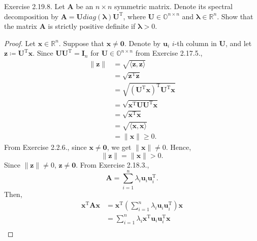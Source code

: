 \documentclass{article}
\theoremstyle{plain}
\begin{document}
\begin{itembox}[l]{Exercise 2.19.8.}
	Let $\bm{A}$ be an $n \times n$ symmetric matrix. Denote its spectral decomposition
	by $\bm{A} =  \bm{U} diag(\bm{\lambda}) \bm{U}^{\mathrm{T}}$,
	where $\bm{U} \in \mathbb{O}^{n \times n}$ and $\bm{\lambda} \in \mathbb{R}^n$.
	Show that the matrix $\bm{A}$ is strictly positive definite if $\bm{\lambda} > 0$.
\end{itembox}


\begin{proof}
	Let $\bm{x} \in \mathbb{R}^n$. Suppose that $\bm{x} \neq \bm{0}$.
	Denote by $\bm{u}_i$ $i$-th column in $\bm{U}$, and let $\bm{z} \coloneq \bm{U}^{\mathrm{T}} \bm{x}$.
	Since $\bm{U} \bm{U}^{\mathrm{T}} = \bm{I}_n$ for $\bm{U} \in \mathbb{O}^{n \times n}$ from Exercise 2.17.5.,
	\begin{equation*}
		\begin{split}
			\lVert \bm{z} \rVert &= \sqrt{\langle \bm{z} , \bm{z} \rangle} \\
			&= \sqrt{\bm{z}^{\mathrm{T}} \bm{z}} \\
			&= \sqrt{(\bm{U}^{\mathrm{T}} \bm{x})^{\mathrm{T}} \bm{U}^{\mathrm{T}} \bm{x}} \\
			&= \sqrt{\bm{x}^{\mathrm{T}} \bm{U} \bm{U}^{\mathrm{T}} \bm{x}} \\
			&= \sqrt{\bm{x}^{\mathrm{T}} \bm{x}} \\
			&= \sqrt{\langle \bm{x} , \bm{x} \rangle} \\
			&= \lVert \bm{x} \rVert \geq 0 .
		\end{split}
	\end{equation*}
	From Exercise 2.2.6., since $\bm{x} \neq \bm{0}$, we get $\lVert \bm{x} \rVert \neq 0$.
	Hence,
	\begin{equation*}
		\lVert \bm{z} \rVert = \lVert \bm{x} \rVert > 0 .
	\end{equation*}
	Since $\lVert \bm{z} \rVert \neq 0$, $\bm{z} \neq \bm{0}$.
	From Exercise 2.18.3.,
	\begin{equation*}
		\bm{A} = \sum_{i=1}^n \lambda_i \bm{u}_i \bm{u}_i^{\mathrm{T}} .
	\end{equation*}
	Then,
	\begin{equation*}
		\begin{split}
			\bm{x}^{\mathrm{T}} \bm{A} \bm{x} &= \bm{x}^{\mathrm{T}} \left( \sum_{i=1}^n \lambda_i \bm{u}_i \bm{u}_i^{\mathrm{T}} \right) \bm{x} \\
			&= \sum_{i=1}^n \lambda_i \bm{x}^{\mathrm{T}} \bm{u}_i \bm{u}_i^{\mathrm{T}} \bm{x} \\

\end{split}
\end{equation*}
\end{proof}
\end{document}
